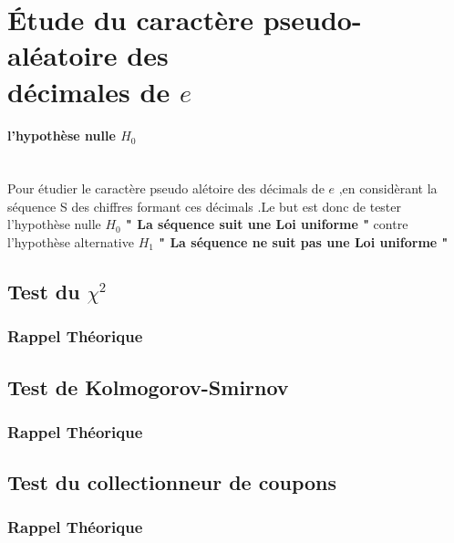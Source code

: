 \section[Étude du caractère pseudo-aléatoire des décimales de \texorpdfstring{$e$}{Lg}]
{Étude du caractère pseudo-aléatoire des \\ décimales de \texorpdfstring{$e$}{Lg}}
    \paragraph{l'hypothèse nulle $H_0$} \\

    
    Pour étudier le caractère pseudo alétoire des décimals de $e$ ,en considèrant la séquence S des chiffres formant ces décimals .Le but est donc de tester l'hypothèse nulle \textbf{$H_0$ " La séquence suit une Loi uniforme "} contre l'hypothèse alternative 
    \textbf{$H_1$ " La séquence ne suit pas une Loi uniforme "}
\subsection{Test du $\chi^2$}
\subsubsection{Rappel Théorique }
\subsection{Test de Kolmogorov-Smirnov}
\subsubsection{Rappel Théorique }
\subsection{Test du collectionneur de coupons}
\subsubsection{Rappel Théorique }
\clearpage